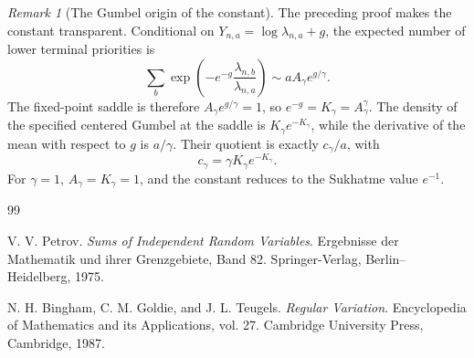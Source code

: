 \documentclass[11pt]{article}
\theoremstyle{remark}
\newtheorem{remark}[theorem]{Remark}
\begin{document}
\begin{remark}[The Gumbel origin of the constant]\label{rem:gumbel-endpoint-constant}
The preceding proof makes the constant transparent.  Conditional on
\(Y_{n,a}=\log\lambda_{n,a}+g\), the expected number of lower terminal priorities
is
\[
        \sum_b\exp\left(-e^{-g}\frac{\lambda_{n,b}}{\lambda_{n,a}}\right)
        \sim aA_\gamma e^{g/\gamma}.
\]
The fixed-point saddle is therefore
\(A_\gamma e^{g/\gamma}=1\), so
\(e^{-g}=K_\gamma=A_\gamma^\gamma\).  The density of the specified centered
Gumbel at the saddle is \(K_\gamma e^{-K_\gamma}\), while the derivative of the
mean with respect to \(g\) is \(a/\gamma\).  Their quotient is exactly
\(c_\gamma/a\), with
\[
        c_\gamma=\gamma K_\gamma e^{-K_\gamma}.
\]
For \(\gamma=1\), \(A_\gamma=K_\gamma=1\), and the constant reduces to the
Sukhatme value \(e^{-1}\).
\end{remark}


\begin{thebibliography}{99}

V. V. Petrov.
\newblock \emph{Sums of Independent Random Variables}.
\newblock Ergebnisse der Mathematik und ihrer Grenzgebiete, Band 82.
\newblock Springer-Verlag, Berlin--Heidelberg, 1975.

N. H. Bingham, C. M. Goldie, and J. L. Teugels.
\newblock \emph{Regular Variation}.
\newblock Encyclopedia of Mathematics and its Applications, vol. 27.
\newblock Cambridge University Press, Cambridge, 1987.

\end{thebibliography}
\end{document}
